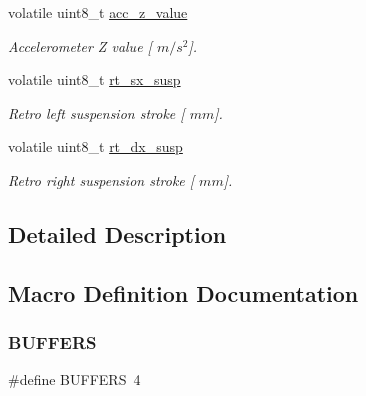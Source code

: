 \begin{DoxyCompactItemize}
volatile uint8\+\_\+t \mbox{\hyperlink{group___board__model__group_ga4779043af8ceac73610675efc457aaaf}{acc\+\_\+z\+\_\+value}}
\begin{DoxyCompactList}\small\item\em Accelerometer Z value \mbox{[} $m/s^{2}$\mbox{]}. \end{DoxyCompactList}\item 
\mbox{\label{group___board__model__group_gaf3ea4d8836939176bd6b4f994518e4c8}} 
volatile uint8\+\_\+t \mbox{\hyperlink{group___board__model__group_gaf3ea4d8836939176bd6b4f994518e4c8}{rt\+\_\+sx\+\_\+susp}}
\begin{DoxyCompactList}\small\item\em Retro left suspension stroke \mbox{[} $mm$\mbox{]}. \end{DoxyCompactList}\item 
\mbox{\label{group___board__model__group_ga6b55629e8341a3f0e9143ec931712dba}} 
volatile uint8\+\_\+t \mbox{\hyperlink{group___board__model__group_ga6b55629e8341a3f0e9143ec931712dba}{rt\+\_\+dx\+\_\+susp}}
\begin{DoxyCompactList}\small\item\em Retro right suspension stroke \mbox{[} $mm$\mbox{]}. \end{DoxyCompactList}\end{DoxyCompactItemize}


\subsection{Detailed Description}


\subsection{Macro Definition Documentation}
\mbox{\label{group___board__model__group_gaabe0f927d44a09f458bd5fe5ab4e2f7f}} 
\subsubsection{\texorpdfstring{B\+U\+F\+F\+E\+RS}{BUFFERS}}
{\footnotesize\ttfamily \#define B\+U\+F\+F\+E\+RS~4}



